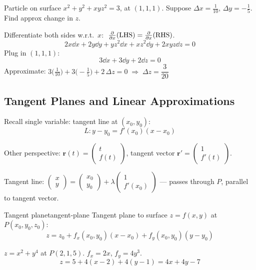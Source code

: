 \begin{example}
  Particle on surface $x^{2}+y^{2}+xyz^{2}=3$, at $(1,1,1)$.
  Suppose $\Delta x=\tfrac{1}{10}$, $\Delta y=-\tfrac{1}{5}$.
  Find approx change in $z$.

  Differentiate both sides w.r.t.\ $x$:
  $\;\frac{\partial }{\partial x}(\text{LHS}) = \frac{\partial }{\partial x}(\text{RHS})$.
  \[
    2x\dd{x}+2y\dd{y}+yz^{2}\dd{x}+xz^{2}\dd{y}+2xyz\dd{z}=0
  \]
  Plug in $(1,1,1)$:
  \[
    3\dd{x}+3\dd{y}+2\dd{z}=0
  \]
  Approximate: $3\bigl(\tfrac{1}{10}\bigr)+3\bigl(-\tfrac{1}{5}\bigr)+2\,\Delta z=0
    \;\Longrightarrow\;
    \Delta z = \dfrac{3}{20}$
\end{example}

\subsection{Tangent Planes and Linear Approximations}

Recall single variable: tangent line at $(x_{0},y_{0})$:
\[
  L\colon y-y_{0} = f'(x_{0})(x-x_{0})
\]

Other perspective: $\mathbf{r}(t)=
  \begin{pmatrix}
    t \\f(t)
  \end{pmatrix}
$, \;
tangent vector $\mathbf{r}'=
  \begin{pmatrix}
    1 \\f'(t)
  \end{pmatrix}
$.

Tangent line:
$
  \begin{pmatrix}
    x \\y
  \end{pmatrix}
  =
  \begin{pmatrix}
    x_{0} \\y_{0}
  \end{pmatrix}
  + \lambda
  \begin{pmatrix}
    1 \\f'(x_{0})
  \end{pmatrix}
$
— passes through $P$, parallel to tangent vector.

\begin{definition}{Tangent plane}{tangent-plane}
  Tangent plane to surface $z=f(x,y)$ at $P(x_{0},y_{0},z_{0})$:
  \[
    z = z_{0} + f_{x}(x_{0},y_{0})(x-x_{0}) + f_{y}(x_{0},y_{0})(y-y_{0})
  \]
\end{definition}

\begin{example}
  $z = x^{2}+y^{4}$ at $P(2,1,5)$. \;
  $f_{x}=2x$, $f_{y}=4y^{3}$.
  \[
    z = 5+4(x-2)+4(y-1) = 4x+4y-7
  \]
\end{example}

